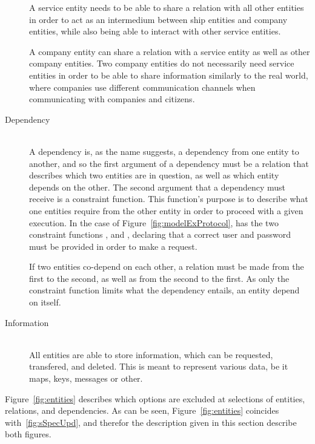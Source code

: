 \begin{description}
		A service entity needs to be able to share a relation with all other entities in order to act as an intermedium between ship entities and company entities, while also being able to interact with other service entities.

		A company entity can share a relation with a service entity as well as other company entities. Two company entities do not necessarily need service entities in order to be able to share information similarly to the real world, where companies use different communication channels when communicating with companies and citizens.
	\item[Dependency]\ \\
		A dependency is, as the name suggests, a dependency from one entity to another, and so the first argument of a dependency must be a relation that describes which two entities are in question, as well as which entity depends on the other. The second argument that a dependency must receive is a constraint function. This function's purpose is to describe what one entities require from the other entity in order to proceed with a given execution. In the case of Figure~\ref{fig:modelExProtocol},  has the two constraint functions , and , declaring that a correct user and password must be provided in order to make a request. 

		If two entities co-depend on each other, a relation must be made from the first to the second, as well as from the second to the first. As only the constraint function limits what the dependency entails, an entity  depend on itself.
	\item[Information]\ \\
		All entities are able to store information, which can be requested, transfered, and deleted. This is meant to represent various data, be it maps, keys, messages or other.
\end{description}
\noindent
Figure~\ref{fig:entities} describes which options are excluded at selections of entities, relations, and dependencies. As can be seen, Figure~\ref{fig:entities} coincides with~\ref{fig:sSpecUpd}, and therefor the description given in this section describe both figures. 

